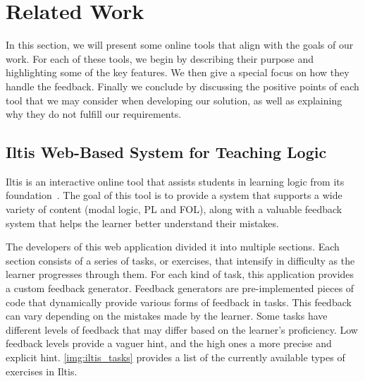 
%

\chapter{Related Work}
\label{chap:related}

In this section, we will present some online tools that align with the goals of our work. For each of these tools, we begin by describing their purpose and highlighting some of the key features. We then give a special focus on how they handle the feedback. Finally we conclude by discussing the positive points of each tool that we may consider when developing our solution, as well as explaining why they do not fulfill our requirements.

\section{Iltis Web-Based System for Teaching Logic}
\label{chap:iltis}

Iltis is an interactive online tool that assists students in learning logic from its foundation~\cite{geck_iltis, geck_2018_introduction}. The goal of this tool is to provide a system that supports a wide variety of content (modal logic, \gls{PL} and \gls{FOL}), along with a valuable feedback system that helps the learner better understand their mistakes. 

The developers of this web application divided it into multiple sections. Each section consists of a series of tasks, or exercises, that intensify in difficulty as the learner progresses through them. For each kind of task, this application provides a custom feedback generator. Feedback generators are pre-implemented pieces of code that dynamically provide various forms of feedback in tasks. This feedback can vary depending on the mistakes made by the learner. Some tasks have different levels of feedback that may differ based on the learner’s proficiency. Low feedback levels provide a vaguer hint, and the high ones a more precise and explicit hint. \autoref{img:iltis_tasks} provides a list of the currently available types of exercises in Iltis.


